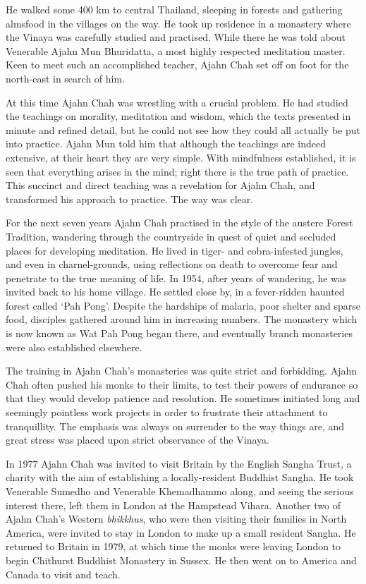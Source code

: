He walked some 400 km to central Thailand, sleeping in forests and
gathering almsfood in the villages on the way. He took up residence in a
monastery where the Vinaya was carefully studied and practised. While
there he was told about Venerable Ajahn Mun Bhuridatta, a most highly
respected meditation master. Keen to meet such an accomplished teacher, 
Ajahn Chah set off on foot for the north-east in search of him. 

At this time Ajahn Chah was wrestling with a crucial problem. He had
studied the teachings on morality, meditation and wisdom, which the
texts presented in minute and refined detail, but he could not see how
they could all actually be put into practice. Ajahn Mun told him that
although the teachings are indeed extensive, at their heart they are
very simple. With mindfulness established, it is seen that everything
arises in the mind; right there is the true path of practice. This
succinct and direct teaching was a revelation for Ajahn Chah, and
transformed his approach to practice. The way was clear. 

For the next seven years Ajahn Chah practised in the style of the
austere Forest Tradition, wandering through the countryside in quest of
quiet and secluded places for developing meditation. He lived in tiger-
and cobra-infested jungles, and even in charnel-grounds, using
reflections on death to overcome fear and penetrate to the true meaning
of life. In 1954, after years of wandering, he was invited back to his
home village. He settled close by, in a fever-ridden haunted forest
called `Pah Pong'. Despite the hardships of malaria, poor shelter and
sparse food, disciples gathered around him in increasing numbers. The
monastery which is now known as Wat Pah Pong began there, and eventually
branch monasteries were also established elsewhere. 

The training in Ajahn Chah's monasteries was quite strict and
forbidding. Ajahn Chah often pushed his monks to their limits, to test
their powers of endurance so that they would develop patience and
resolution. He sometimes initiated long and seemingly pointless work
projects in order to frustrate their attachment to tranquillity. The
emphasis was always on surrender to the way things are, and great stress
was placed upon strict observance of the Vinaya. 

In 1977 Ajahn Chah was invited to visit Britain by the English Sangha
Trust, a charity with the aim of establishing a locally-resident
Buddhist Sangha. He took Venerable Sumedho and Venerable Khemadhammo
along, and seeing the serious interest there, left them in London at the
Hampstead Vihara. Another two of Ajahn Chah's Western \emph{bhikkhus}, 
who were then visiting their families in North America, were invited to
stay in London to make up a small resident Sangha. He returned to
Britain in 1979, at which time the monks were leaving London to begin
Chithurst Buddhist Monastery in Sussex. He then went on to America and
Canada to visit and teach. 

